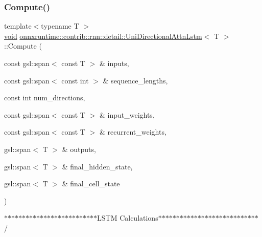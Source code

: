 \subsubsection{\texorpdfstring{Compute()}{Compute()}}
{\footnotesize\ttfamily template$<$typename T $>$ \\
\mbox{\hyperlink{mlasi_8h_a88f941d423cb2a819b70a1358982b1a6}{void}} \mbox{\hyperlink{classonnxruntime_1_1contrib_1_1rnn_1_1detail_1_1UniDirectionalAttnLstm}{onnxruntime\+::contrib\+::rnn\+::detail\+::\+Uni\+Directional\+Attn\+Lstm}}$<$ T $>$\+::Compute (\begin{DoxyParamCaption}\item[{const gsl\+::span$<$ const T $>$ \&}]{inputs,  }\item[{const gsl\+::span$<$ const int $>$ \&}]{sequence\+\_\+lengths,  }\item[{const int}]{num\+\_\+directions,  }\item[{const gsl\+::span$<$ const T $>$ \&}]{input\+\_\+weights,  }\item[{const gsl\+::span$<$ const T $>$ \&}]{recurrent\+\_\+weights,  }\item[{gsl\+::span$<$ T $>$ \&}]{outputs,  }\item[{gsl\+::span$<$ T $>$ \&}]{final\+\_\+hidden\+\_\+state,  }\item[{gsl\+::span$<$ T $>$ \&}]{final\+\_\+cell\+\_\+state }\end{DoxyParamCaption})}

$\ast$$\ast$$\ast$$\ast$$\ast$$\ast$$\ast$$\ast$$\ast$$\ast$$\ast$$\ast$$\ast$$\ast$$\ast$$\ast$$\ast$$\ast$$\ast$$\ast$$\ast$$\ast$$\ast$$\ast$$\ast$$\ast$\+L\+S\+TM Calculations$\ast$$\ast$$\ast$$\ast$$\ast$$\ast$$\ast$$\ast$$\ast$$\ast$$\ast$$\ast$$\ast$$\ast$$\ast$$\ast$$\ast$$\ast$$\ast$$\ast$$\ast$$\ast$$\ast$$\ast$$\ast$$\ast$$\ast$$\ast$/ \mbox{\label{classonnxruntime_1_1contrib_1_1rnn_1_1detail_1_1UniDirectionalAttnLstm_afa2e0511cc65d7bdcb3e4d67c3829959}} 

